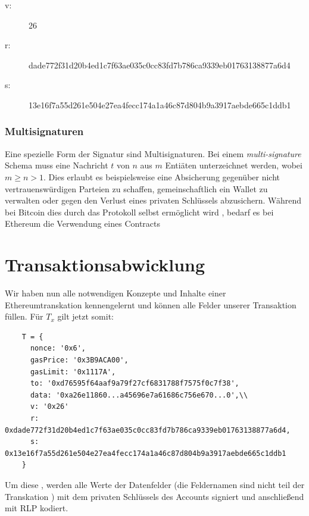 \documentclass[runningheads]{llncs}
\begin{document}
\begin{description}
  \item[v:] 26
  \item [r:] dade772f31d20b4ed1c7f63ae035c0cc83fd7b786ca9339eb01763138877a6d4
  \item[s:] 13e16f7a55d261e504e27ea4fecc174a1a46c87d804b9a3917aebde665c1ddb1
\end{description}

\subsubsection{Multisignaturen}
Eine spezielle Form der Signatur sind Multisignaturen. Bei einem \textit{multi-signature} Schema muss eine Nachricht $ t $ von $ n $ aus $ m $ Entiäten unterzeichnet werden, wobei $ m \geq n > 1 $. \cite[S. 2]{hutchison_identity-based_2006} Dies erlaubt es beispielsweise eine Absicherung gegenüber nicht vertrauenswürdigen Parteien zu schaffen, gemeinschaftlich ein Wallet zu verwalten oder gegen den Verlust eines privaten Schlüssels abzusichern. Während bei Bitcoin dies durch das Protokoll selbst ermöglicht wird \cite{noauthor_multisignature_nodate}, bedarf es bei Ethereum die Verwendung eines Contracts \cite{noauthor_frequently_nodate}


\section{Transaktionsabwicklung}
Wir haben nun alle notwendigen Konzepte und Inhalte einer Ethereumtranskation kennengelernt und können alle Felder unserer Transaktion füllen. Für $T_x$ gilt jetzt somit:
\begin{center}
  \begin{verbatim}
    T = { 
      nonce: '0x6',
      gasPrice: '0x3B9ACA00',
      gasLimit: '0x1117A',
      to: '0xd76595f64aaf9a79f27cf6831788f7575f0c7f38',
      data: '0xa26e11860...a45696e7a61686c756e670...0',\\
      v: '0x26'
      r: 0xdade772f31d20b4ed1c7f63ae035c0cc83fd7b786ca9339eb01763138877a6d4,
      s: 0x13e16f7a55d261e504e27ea4fecc174a1a46c87d804b9a3917aebde665c1ddb1
    }
  \end{verbatim}
\end{center}

Um diese , werden alle Werte der Datenfelder (die Feldernamen sind nicht teil der Transkation \cite[S. 100]{antonopoulos_mastering_2019}) mit dem privaten Schlüssels des Accounts signiert und anschließend mit RLP kodiert.
\end{document}
